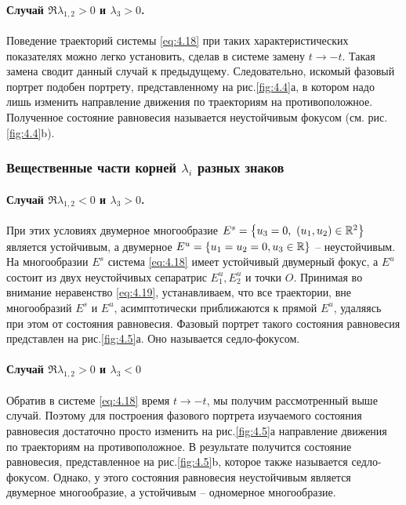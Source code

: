 \paragraph{Случай $\Re \lambda_{1,2}>0$ и $\lambda_3>0$.}%
\label{par:sluchai_re_1,2_0_i_lambda_3_0_}

Поведение траекторий системы \eqref{eq:4.18} при таких характеристических показателях можно легко установить, сделав в системе замену $t \to - t$. Такая замена сводит данный случай к предыдущему.
Следовательно, искомый фазовый портрет подобен портрету, представленному на рис.\ref{fig:4.4}а, в котором надо лишь изменить направление движения по траекториям на противоположное. Полученное состояние равновесия называется неустойчивым фокусом (см. рис.\ref{fig:4.4}b).

\subsubsection{Вещественные части корней $\lambda_i$ разных знаков}%
\label{ssub:veshchestvennye_chasti_kornei_lambda_i_raznykh_znakov}

\paragraph{Случай $\Re \lambda_{1,2}<0$ и $\lambda_3>0$.}%
\label{par:sluchai_re_1,2_0_i_lambda_3_0_}

При этих условиях двумерное многообразие $E^{s} = \qty{ u_3 =0, ~ (u_1, u_2) \in \mathbb{R}^2}$ является устойчивым, а двумерное $E^{u} = \qty{u_1 = u_2=0, u_3 \in \mathbb{R}}$ -- неустойчивым.
На многообразии $E^{s}$ система \eqref{eq:4.18} имеет устойчивый двумерный фокус, а $E^{u}$ состоит из двух неустойчивых сепаратрис $E_1^{u}, E_2^{u}$ и точки $O$. Принимая во внимание неравенство \eqref{eq:4.19}, устанавливаем, что все траектории, вне многообразий $E^{s}$ и $E^{u}$,
асимптотически приближаются к прямой $E^{u}$, удаляясь при этом от состояния равновесия. Фазовый портрет такого состояния равновесия представлен на рис.\ref{fig:4.5}а. Оно называется седло-фокусом.

\paragraph{Случай $\Re \lambda_{1,2}>0$ и $\lambda_3<0$}%
\label{par:sluchai_re_1,2_0_i_lambda_3_0_}
Обратив в системе \eqref{eq:4.18} время $t \to - t$, мы получим рассмотренный выше случай. Поэтому для построения фазового портрета изучаемого состояния равновесия достаточно просто изменить на рис.\ref{fig:4.5}а направление движения по траекториям на противоположное. В результате получится состояние равновесия, представленное на рис.\ref{fig:4.5}b, которое также называется седло-фокусом. Однако, у этого состояния равновесия неустойчивым является двумерное многообразие, а устойчивым -- одномерное многообразие.

